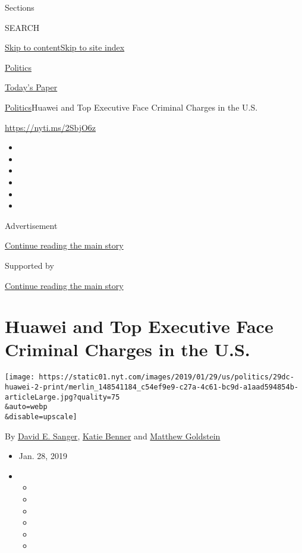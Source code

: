 Sections

SEARCH

\protect\hyperlink{site-content}{Skip to
content}\protect\hyperlink{site-index}{Skip to site index}

\href{https://www.nytimes.com/section/politics}{Politics}

\href{https://myaccount.nytimes.com/auth/login?response_type=cookie\&client_id=vi}{}

\href{https://www.nytimes.com/section/todayspaper}{Today's Paper}

\href{/section/politics}{Politics}\textbar{}Huawei and Top Executive
Face Criminal Charges in the U.S.

\url{https://nyti.ms/2SbjO6z}

\begin{itemize}
\item
\item
\item
\item
\item
\item
\end{itemize}

Advertisement

\protect\hyperlink{after-top}{Continue reading the main story}

Supported by

\protect\hyperlink{after-sponsor}{Continue reading the main story}

\hypertarget{huawei-and-top-executive-face-criminal-charges-in-the-us}{%
\section{Huawei and Top Executive Face Criminal Charges in the
U.S.}\label{huawei-and-top-executive-face-criminal-charges-in-the-us}}

\texttt{[image: https://static01.nyt.com/images/2019/01/29/us/politics/29dc-huawei-2-print/merlin\_148541184\_c54ef9e9-c27a-4c61-bc9d-a1aad594854b-articleLarge.jpg?quality=75\\\&auto=webp\\\&disable=upscale]}

By \href{https://www.nytimes.com/by/david-e-sanger}{David E. Sanger},
\href{https://www.nytimes.com/by/katie-benner}{Katie Benner} and
\href{https://www.nytimes.com/by/matthew-goldstein}{Matthew Goldstein}

\begin{itemize}
\item
  Jan. 28, 2019
\item
  \begin{itemize}
  \item
  \item
  \item
  \item
  \item
  \item
  \end{itemize}
\end{itemize}

